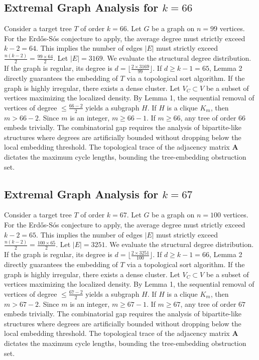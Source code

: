 \documentclass[11pt,a4paper]{article}
\begin{document}
\subsection{Extremal Graph Analysis for $k=66$}
Consider a target tree $T$ of order $k=66$.
Let $G$ be a graph on $n=99$ vertices.
For the Erd\H{o}s-S\'os conjecture to apply, the average degree must strictly exceed $k-2 = 64$.
This implies the number of edges $|E|$ must strictly exceed $\frac{n(k-2)}{2} = \frac{99 \times 64}{2}$.
Let $|E| = 3169$.
We evaluate the structural degree distribution. If the graph is regular, its degree is $d = \lfloor \frac{2 \times 3169}{99} \rfloor$.
If $d \geq k-1 = 65$, Lemma 2 directly guarantees the embedding of $T$ via a topological sort algorithm.
If the graph is highly irregular, there exists a dense cluster. Let $V_C \subset V$ be a subset of vertices maximizing the localized density.
By Lemma 1, the sequential removal of vertices of degree $\leq \frac{66-2}{2}$ yields a subgraph $H$.
If $H$ is a clique $K_{m}$, then $m > 66-2$. Since $m$ is an integer, $m \geq 66-1$. If $m \geq 66$, any tree of order $66$ embeds trivially.
The combinatorial gap requires the analysis of bipartite-like structures where degrees are artificially bounded without dropping below the local embedding threshold. The topological trace of the adjacency matrix $\mathbf{A}$ dictates the maximum cycle lengths, bounding the tree-embedding obstruction set.


\subsection{Extremal Graph Analysis for $k=67$}
Consider a target tree $T$ of order $k=67$.
Let $G$ be a graph on $n=100$ vertices.
For the Erd\H{o}s-S\'os conjecture to apply, the average degree must strictly exceed $k-2 = 65$.
This implies the number of edges $|E|$ must strictly exceed $\frac{n(k-2)}{2} = \frac{100 \times 65}{2}$.
Let $|E| = 3251$.
We evaluate the structural degree distribution. If the graph is regular, its degree is $d = \lfloor \frac{2 \times 3251}{100} \rfloor$.
If $d \geq k-1 = 66$, Lemma 2 directly guarantees the embedding of $T$ via a topological sort algorithm.
If the graph is highly irregular, there exists a dense cluster. Let $V_C \subset V$ be a subset of vertices maximizing the localized density.
By Lemma 1, the sequential removal of vertices of degree $\leq \frac{67-2}{2}$ yields a subgraph $H$.
If $H$ is a clique $K_{m}$, then $m > 67-2$. Since $m$ is an integer, $m \geq 67-1$. If $m \geq 67$, any tree of order $67$ embeds trivially.
The combinatorial gap requires the analysis of bipartite-like structures where degrees are artificially bounded without dropping below the local embedding threshold. The topological trace of the adjacency matrix $\mathbf{A}$ dictates the maximum cycle lengths, bounding the tree-embedding obstruction set.
\end{document}
